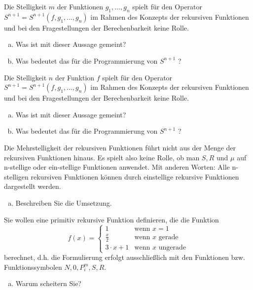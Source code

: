 \begin{card}
  Die Stelligkeit $m$ der Funktionen $g_1, \ldots, g_n$ spielt für den Operator $S^{n+1} = S^{n+1}(f, g_1, \ldots, g_n)$ im Rahmen des Konzepts der rekursiven Funktionen und bei den Fragestellungen der Berechenbarkeit keine Rolle.
  \begin{enumerate}[a)]
    \item Was ist mit dieser Aussage gemeint?
    \item Was bedeutet das für die Programmierung von $S^{n+1}$ ?
  \end{enumerate}
  \hr
\end{card}

\begin{card}
  Die Stelligkeit $n$ der Funktion $f$ spielt für den Operator $S^{n+1} = S^{n+1}(f, g_1, \ldots, g_n)$ im Rahmen des Konzepts der rekursiven Funktionen und bei den Fragestellungen der Berechenbarkeit keine Rolle.
  \begin{enumerate}[a)]
    \item Was ist mit dieser Aussage gemeint?
    \item Was bedeutet das für die Programmierung von $S^{n+1}$ ?
  \end{enumerate}
  \hr
\end{card}

\begin{card}
  Die Mehrstelligkeit der rekursiven Funktionen führt nicht aus der Menge der rekursiven Funktionen hinaus. Es spielt also keine Rolle, ob man $S, R$ und $\mu$ auf n-stellige oder ein-stellige Funktionen anwendet. Mit anderen Worten: Alle n-stelligen rekursiven Funktionen können durch einstellige rekursive Funktionen dargestellt werden.
  \begin{enumerate}[a)]
    \item Beschreiben Sie die Umsetzung.
  \end{enumerate}
  \hr
\end{card}

\begin{card}
Sie wollen eine primitiv rekursive Funktion definieren, die die Funktion
\[
f(x) =
\begin{cases}
1 & \text{wenn $x = 1$} \\
  \frac{x}{2} & \text{wenn $x$ gerade} \\
3 \cdot x + 1 &\text{wenn $x$ ungerade}
\end{cases}
\]
berechnet, d.h. die Formulierung erfolgt ausschließlich mit den Funktionen bzw. Funktionssymbolen $N, 0, P^m_i , S, R$.
  \begin{enumerate}[a)]
    \item Warum scheitern Sie?
  \end{enumerate}
  \hr
\end{card}

